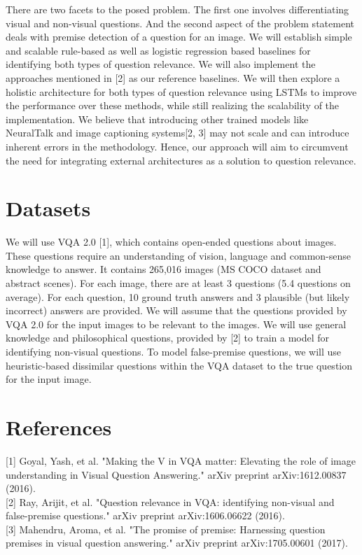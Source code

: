 \documentclass{article}
\begin{document}
There are two facets to the posed problem. The first one involves differentiating visual and non-visual questions. And the second aspect of the problem statement deals with premise detection of a question for an image. We will establish simple and scalable rule-based as well as logistic regression based baselines for identifying both types of question relevance. We will also implement the approaches mentioned in [2] as our reference baselines. We will then explore a holistic architecture for both types of question relevance using LSTMs to improve the performance over these methods, while still realizing the scalability of the implementation. We believe that introducing other trained models like NeuralTalk and image captioning systems[2, 3] may not scale and can introduce inherent errors in the methodology. Hence, our approach will aim to circumvent the need for integrating external architectures as a solution to question relevance.

\section{Datasets}
We will use VQA 2.0 [1], which contains open-ended questions about images. These questions require an understanding of vision, language and common-sense knowledge to answer. It contains 265,016 images (MS COCO dataset and abstract scenes). For each image, there are at least 3 questions (5.4 questions on average). For each question, 10 ground truth answers and 3 plausible (but likely incorrect) answers are provided. We will assume that the questions provided by VQA 2.0 for the input images to be relevant to the images. We will use general knowledge and philosophical questions, provided by [2] to train a model for identifying non-visual questions. To model false-premise questions, we will use heuristic-based dissimilar questions within the VQA dataset to the true question for the input image. 

\section*{References}

[1] Goyal, Yash, et al. "Making the V in VQA matter: Elevating the role of image understanding in Visual Question Answering." arXiv preprint arXiv:1612.00837 (2016).\\

[2] Ray, Arijit, et al. "Question relevance in VQA: identifying non-visual and false-premise questions." arXiv preprint arXiv:1606.06622 (2016).\\ 

[3] Mahendru, Aroma, et al. "The promise of premise: Harnessing question premises in visual question answering." arXiv preprint arXiv:1705.00601 (2017).\\ 
\end{document}
